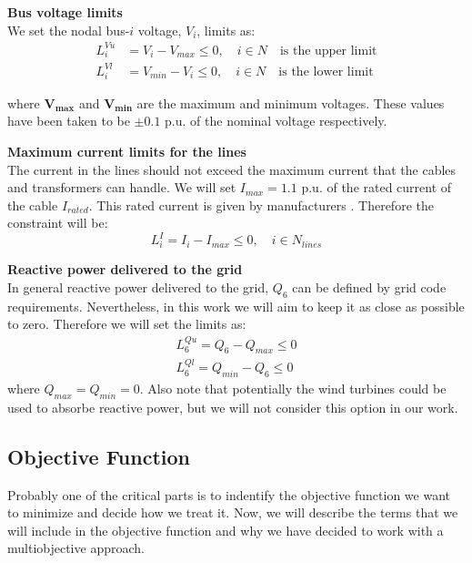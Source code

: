 \documentclass[a4paper,11pt, titlepage, twoside]{article}
\begin{document}
\textbf{Bus voltage limits}\\
We set the nodal bus-$i$ voltage, $V_i$, limits as:
\begin{equation}
\begin{aligned}
    L_{i}^{Vu} &= V_i - V_{max} \leq 0, \quad i \in N \quad \text{is the upper limit} \\
    L_{i}^{Vl} &= V_{min} - V_i \leq 0, \quad i \in N \quad \text{is the lower limit}   
\end{aligned}    
\end{equation}

where $\mathbf{V_{max}}$ and $\mathbf{V_{min}}$ are the maximum and minimum voltages. These values have been taken to be $\pm 0.1$ p.u. of the nominal voltage respectively.

\textbf{Maximum current limits for the lines}\\
The current in the lines should not exceed the maximum current that the cables and transformers can handle. We will set $I_{max} = 1.1$ p.u. of the rated current of the cable $I_{rated}$. This rated current is given by manufacturers \cite{ABB}.
Therefore the constraint will be:
\begin{equation}
    L_{i}^{I} = I_i - I_{max} \leq 0, \quad i \in N_{lines}
\end{equation}

\textbf{Reactive power delivered to the grid}\\
In general reactive power delivered to the grid, $Q_6$ can be defined by grid code requirements. Nevertheless, in this work we will aim to keep it as close as
possible to zero. Therefore we will set the limits as:
\begin{equation}
\begin{aligned}
    L_{6}^{Qu} = Q_6 - Q_{max} \leq 0 \\
    L_{6}^{Ql} = Q_{min} - Q_{6} \leq 0
\end{aligned}
\end{equation}
where $Q_{max}=Q_{min}=0$. Also note that potentially the wind turbines could be used to absorbe reactive power, but we will not consider this option in our work.


\subsection{Objective Function}\label{objfun}

Probably one of the critical parts is to indentify the objective function we want to minimize and decide how we treat it. Now, we will describe the terms that we will include in the objective function
and why we have decided to work with a multiobjective approach.\par
\end{document}
